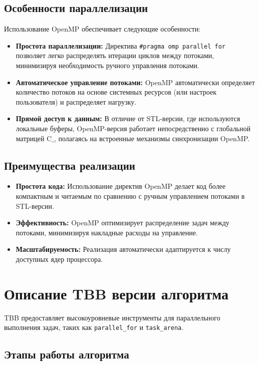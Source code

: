 \documentclass[a4paper,12pt]{article}
\begin{document}
\subsection{Особенности параллелизации}
Использование OpenMP обеспечивает следующие особенности:
\begin{itemize}
    \item \textbf{Простота параллелизации:} Директива \texttt{\#pragma omp parallel for} позволяет легко распределять итерации циклов между потоками, минимизируя необходимость ручного управления потоками.
    \item \textbf{Автоматическое управление потоками:} OpenMP автоматически определяет количество потоков на основе системных ресурсов (или настроек пользователя) и распределяет нагрузку.
    \item \textbf{Прямой доступ к данным:} В отличие от STL-версии, где используются локальные буферы, OpenMP-версия работает непосредственно с глобальной матрицей \( \text{C\_} \), полагаясь на встроенные механизмы синхронизации OpenMP.
\end{itemize}

\subsection{Преимущества реализации}
\begin{itemize}
    \item \textbf{Простота кода:} Использование директив OpenMP делает код более компактным и читаемым по сравнению с ручным управлением потоками в STL-версии.
    \item \textbf{Эффективность:} OpenMP оптимизирует распределение задач между потоками, минимизируя накладные расходы на управление.
    \item \textbf {Масштабируемость:} Реализация автоматически адаптируется к числу доступных ядер процессора.
\end{itemize}

\section{Описание TBB версии алгоритма}
TBB предоставляет высокоуровневые инструменты для параллельного выполнения задач, таких как \texttt{parallel\_for} и \texttt{task\_arena}.

\subsection{Этапы работы алгоритма}
\end{document}
